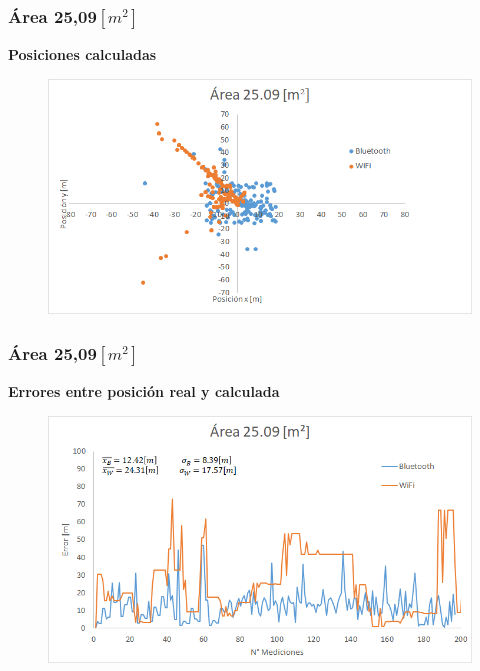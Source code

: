 \documentclass[mathserif]{beamer}
\begin{document}

\begin{frame}
\frametitle{Área 25,09$[m^2]$}

\textbf{Posiciones calculadas}

\begin{figure}
\includegraphics[width=\textwidth]{../figures_chesta/resultados/posicion__25_09}
\end{figure}


\end{frame}


\begin{frame}
\frametitle{Área 25,09$[m^2]$}

\textbf{Errores entre posición real y calculada}

\begin{figure}
\includegraphics[width=\textwidth]{../figures_chesta/resultados/area__25_09}
\end{figure}



\end{frame}
\end{document}
